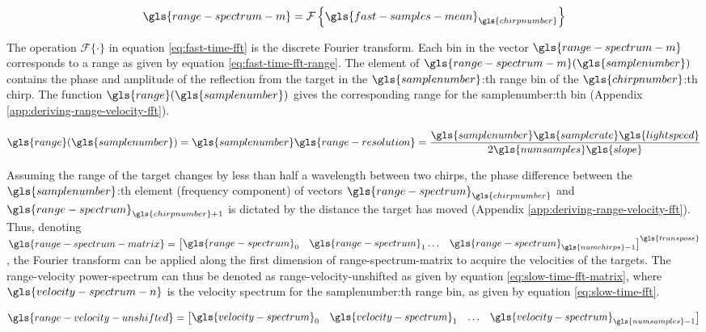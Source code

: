 \begin{equation}
    \label{eq:fast-time-fft}
    \gls{range-spectrum-m} = \mathcal{F} \left\{ \gls{fast-samples-mean}_{\gls{chirpnumber}} \right\}
\end{equation}

The operation $\mathcal{F} \{ \cdot \}$ in equation \ref{eq:fast-time-fft} is the discrete Fourier transform.
Each bin in the vector $\gls{range-spectrum-m}$ corresponds to a range as given by equation \ref{eq:fast-time-fft-range}.
The element of $\gls{range-spectrum-m}(\gls{samplenumber})$ contains the phase and amplitude of the reflection from the target in the 
$\gls{samplenumber}$:th range bin of the $\gls{chirpnumber}$:th chirp.
The function $\gls{range}(\gls{samplenumber})$ gives the corresponding range
for the \gls{samplenumber}:th bin (Appendix \ref{app:deriving-range-velocity-fft}).

\begin{equation}
    \label{eq:fast-time-fft-range}
    \gls{range}(\gls{samplenumber}) = \gls{samplenumber} \gls{range-resolution} = \frac{\gls{samplenumber} \gls{samplerate} \gls{lightspeed}}{2\gls{numsamples}\gls{slope}}
\end{equation}

Assuming the range of the target changes by less than half a wavelength between two chirps,
the phase difference between the $\gls{samplenumber}$:th element (frequency component) of vectors
$\gls{range-spectrum}_{\gls{chirpnumber}}$ and $\gls{range-spectrum}_{\gls{chirpnumber}+1}$
is dictated by the distance the target has moved (Appendix \ref{app:deriving-range-velocity-fft}).
Thus, denoting $\gls{range-spectrum-matrix} = \begin{bmatrix} \gls{range-spectrum}_{0} & \gls{range-spectrum}_{1} \ldots & \gls{range-spectrum}_{\gls{numchirps}-1} \end{bmatrix}^{\gls{transpose}}$,
the Fourier transform can be applied along the first dimension of \gls{range-spectrum-matrix} to acquire the velocities of the targets.
The range-velocity power-spectrum can thus be denoted as 
\gls{range-velocity-unshifted} as given by equation \ref{eq:slow-time-fft-matrix},
where $\gls{velocity-spectrum-n}$ is the velocity spectrum for the \gls{samplenumber}:th range bin,
as given by equation \ref{eq:slow-time-fft}.

\begin{equation}
    \label{eq:slow-time-fft-matrix}
    \gls{range-velocity-unshifted} = \begin{bmatrix} \gls{velocity-spectrum}_{0} & \gls{velocity-spectrum}_{1} & \ldots & \gls{velocity-spectrum}_{\gls{numsamples}-1}\end{bmatrix}
\end{equation}

